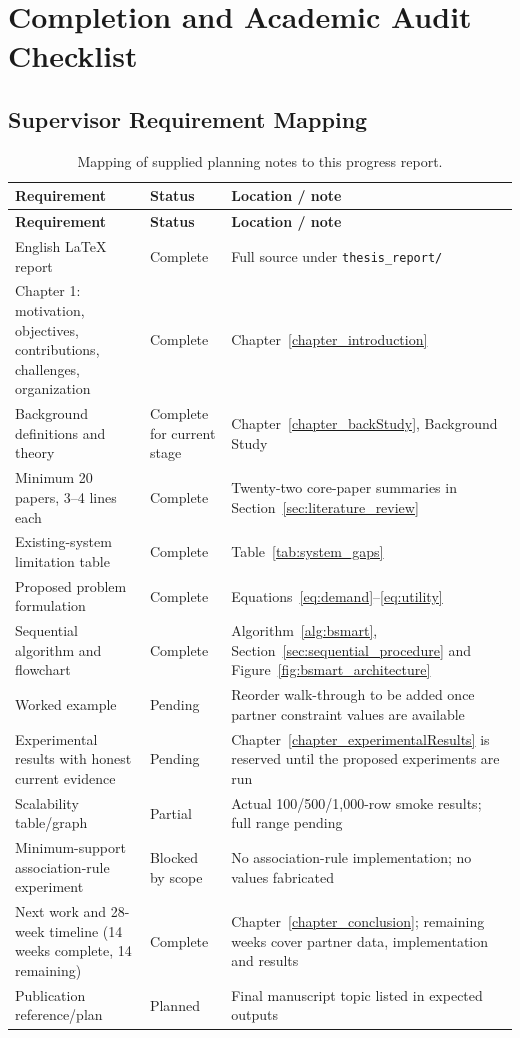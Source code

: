 \chapter{Completion and Academic Audit Checklist}
\label{appendix_audit}

\section{Supervisor Requirement Mapping}

\begin{longtable}{|p{}|p{}|p{}|}
\caption{Mapping of supplied planning notes to this progress report.}\\
\hline
\textbf{Requirement} & \textbf{Status} & \textbf{Location / note} \\
\hline
\endfirsthead
\hline
\textbf{Requirement} & \textbf{Status} & \textbf{Location / note} \\
\hline
\endhead
English LaTeX report & Complete & Full source under \texttt{thesis\_report/} \\
Chapter 1: motivation, objectives, contributions, challenges, organization & Complete & Chapter~\ref{chapter_introduction} \\
Background definitions and theory & Complete for current stage & Chapter~\ref{chapter_backStudy}, Background Study \\
Minimum 20 papers, 3--4 lines each & Complete & Twenty-two core-paper summaries in Section~\ref{sec:literature_review} \\
Existing-system limitation table & Complete & Table~\ref{tab:system_gaps} \\
Proposed problem formulation & Complete & Equations~\ref{eq:demand}--\ref{eq:utility} \\
Sequential algorithm and flowchart & Complete & Algorithm~\ref{alg:bsmart}, Section~\ref{sec:sequential_procedure} and Figure~\ref{fig:bsmart_architecture} \\
Worked example & Pending & Reorder walk-through to be added once partner constraint values are available \\
Experimental results with honest current evidence & Pending & Chapter~\ref{chapter_experimentalResults} is reserved until the proposed experiments are run \\
Scalability table/graph & Partial & Actual 100/500/1,000-row smoke results; full range pending \\
Minimum-support association-rule experiment & Blocked by scope & No association-rule implementation; no values fabricated \\
Next work and 28-week timeline (14 weeks complete, 14 remaining) & Complete & Chapter~\ref{chapter_conclusion}; remaining weeks cover partner data, implementation and results \\
Publication reference/plan & Planned & Final manuscript topic listed in expected outputs \\
\hline
\end{longtable}

